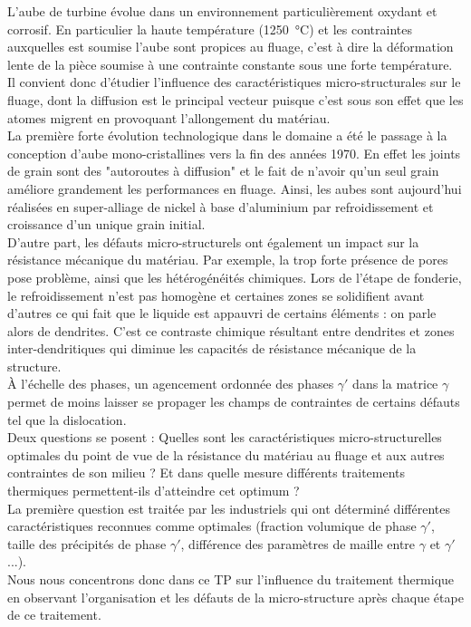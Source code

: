 L'aube de turbine évolue dans un environnement particulièrement oxydant et corrosif. 
En particulier la haute température (\SI{1250}{\celsius}) et les contraintes auxquelles est soumise 
l'aube sont propices au fluage, c'est à dire la déformation lente de la pièce soumise à une contrainte constante sous une forte température. Il convient donc d'étudier l'influence des 
caractéristiques micro-structurales sur le fluage, dont la diffusion est le principal 
vecteur puisque c'est sous son effet que les atomes migrent en provoquant l'allongement du matériau.\\


La première forte évolution technologique dans le domaine a été le passage à la conception 
d'aube mono-cristallines vers la fin des années 1970. En effet les joints de grain sont des
"autoroutes à diffusion" et le fait de n'avoir qu'un seul grain améliore grandement les 
performances en fluage. Ainsi, les aubes sont aujourd'hui réalisées en super-alliage de 
nickel à base d'aluminium par refroidissement et croissance d'un unique grain initial.\\


D'autre part, les défauts micro-structurels ont également un impact sur la résistance 
mécanique du matériau. Par exemple, la trop forte présence de pores pose problème, 
ainsi que les hétérogénéités chimiques. Lors de l'étape de fonderie, le refroidissement
n'est pas homogène et certaines zones se solidifient avant d'autres ce qui fait 
que le liquide est appauvri de certains éléments : on parle alors de dendrites. 
C'est ce contraste chimique résultant entre dendrites et zones inter-dendritiques
qui diminue les capacités de résistance mécanique de la structure.\\


À l'échelle des phases, un agencement ordonnée des phases $\gamma'$ dans la 
matrice $\gamma$ permet de moins laisser se propager les champs de contraintes de 
certains défauts tel que la dislocation.\\


Deux questions se posent : Quelles sont les caractéristiques micro-structurelles 
optimales du point de vue de la résistance du matériau au fluage et aux autres 
contraintes de son milieu ? Et dans quelle mesure différents traitements thermiques 
permettent-ils d'atteindre cet optimum ?\\


La première question est traitée par les industriels qui ont déterminé différentes 
caractéristiques reconnues comme optimales (fraction volumique de phase $\gamma'$, 
taille des précipités de phase $\gamma'$, différence des paramètres de maille 
entre $\gamma$ et $\gamma'$...).\\


Nous nous concentrons donc dans ce TP sur l'influence du traitement thermique en observant l'organisation et les défauts de la micro-structure après chaque étape de ce traitement.

